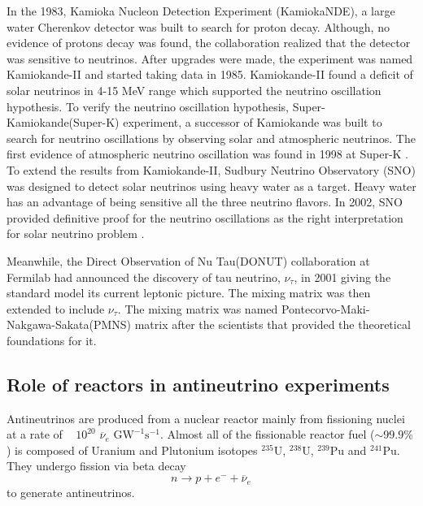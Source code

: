 \documentclass[11pt]{article}
\newcommand{\nuebar}{\ensuremath{\overline{\nu }_{e}} \hspace{1pt}}
\numberwithin{equation}{section}
\begin{document}
In the 1983, Kamioka Nucleon Detection Experiment (KamiokaNDE), a large water Cherenkov detector was built to search for proton decay. Although, no evidence of protons decay was found, the collaboration realized that the detector was sensitive to neutrinos. After upgrades were made, the experiment was named Kamiokande-II and started taking data in 1985. Kamiokande-II found a deficit of solar neutrinos in 4-15 MeV range \cite{hatakeyama1998measurement} which supported the neutrino oscillation hypothesis. To verify the neutrino oscillation hypothesis, Super-Kamiokande(Super-K) experiment, a successor of Kamiokande was built to search for neutrino oscillations by observing solar and atmospheric neutrinos. The first evidence of atmospheric neutrino oscillation was found in 1998 at Super-K \cite{super1999fukuda}. To extend the results from Kamiokande-II, Sudbury Neutrino Observatory  (SNO) was designed to detect solar neutrinos using heavy water as a target. Heavy water has an advantage of being sensitive all the three neutrino flavors. In 2002, SNO provided definitive proof for the neutrino oscillations as the right interpretation for solar neutrino problem \cite{ahmad2002direct}.

Meanwhile, the Direct Observation of Nu Tau(DONUT) collaboration at Fermilab had announced \cite{kodama2001observation} the discovery of tau neutrino, $\nu _{\tau}$, in 2001 giving the standard model its current leptonic picture. The mixing matrix was then extended to include $\nu_\tau$. The mixing matrix was named Pontecorvo-Maki-Nakgawa-Sakata(PMNS) matrix after the scientists that provided the theoretical foundations for it.


\subsection[Role of reactors]{Role of reactors in antineutrino experiments}
\label{reactorrole}

Antineutrinos are produced from a nuclear reactor mainly from fissioning nuclei at a rate of  ~ $10^{20} $ \nuebar$ \textrm{GW}^{-1} \textrm{s}^{-1}$. Almost all of the fissionable reactor fuel ($\sim99.9 \%$) is composed of Uranium and Plutonium isotopes $^{235}$U, $^{238}$U, $  ^{239}\textrm{Pu}$ and $  ^{241}\textrm{Pu}$. They undergo fission via beta decay 
\begin{equation}
n \rightarrow p+e^{-} + \nuebar
\end{equation}
to generate antineutrinos.
\end{document}

